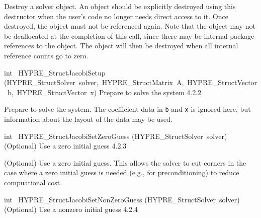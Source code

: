 \documentclass{article}
\begin{document}
\begin{cxxentry}
\begin{cxxentry}
\begin{cxxfunction}
\begin{cxxdoc}
Destroy a solver object.  An object should be explicitly destroyed
using this destructor when the user's code no longer needs direct
access to it.  Once destroyed, the object must not be referenced
again.  Note that the object may not be deallocated at the
completion of this call, since there may be internal package
references to the object.  The object will then be destroyed when
all internal reference counts go to zero.
\end{cxxdoc}
\end{cxxfunction}
\begin{cxxfunction}
{int\ }
        {HYPRE\_StructJacobiSetup}
        {(HYPRE\_StructSolver\ solver,\ HYPRE\_StructMatrix\ A,\ HYPRE\_StructVector\ b,\ HYPRE\_StructVector\ x)}
        {
Prepare to solve the system}
        {4.2.2}
\begin{cxxdoc}

Prepare to solve the system.  The coefficient data in {\tt b} and {\tt x} is
ignored here, but information about the layout of the data may be used.
\end{cxxdoc}
\end{cxxfunction}
\begin{cxxfunction}
{int\ }
        {HYPRE\_StructJacobiSetZeroGuess}
        {(HYPRE\_StructSolver\ solver)}
        {
(Optional) Use a zero initial guess}
        {4.2.3}
\begin{cxxdoc}

(Optional) Use a zero initial guess.  This allows the solver to cut corners
in the case where a zero initial guess is needed (e.g., for preconditioning)
to reduce compuational cost.
\end{cxxdoc}
\end{cxxfunction}
\begin{cxxfunction}
{int\ }
        {HYPRE\_StructJacobiSetNonZeroGuess}
        {(HYPRE\_StructSolver\ solver)}
        {
(Optional) Use a nonzero initial guess}
        {4.2.4}
\begin{cxxdoc}


\end{cxxdoc}
\end{cxxfunction}
\end{cxxentry}
\end{cxxentry}
\end{document}
